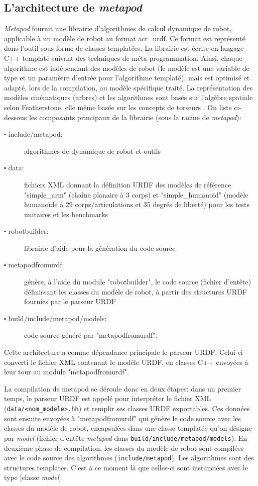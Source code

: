 \documentclass{report}
\begin{document}
\subsection{L'architecture de \emph{metapod}}

\emph{Metapod} fournit une librairie d'algorithmes de calcul dynamique de robot, applicable à un modèle de robot au format \gls{acr_urdf}. Ce format est représenté dans l'outil sous forme de classes templatées. La librairie est écrite en langage C++ templaté suivant des techniques de méta programmation. Ainsi, chaque algorithme est indépendant des modèles de robot (le modèle est une variable de type et un paramètre d'entrée pour l'algorithme templaté), mais est optimisé et adapté, lors de la compilation, au modèle spécifique traité. La représentation des modèles cinématiques (arbres) et les algorithmes sont basés sur l'algèbre spatiale selon Featherstone, elle même basée sur les concepts de torseurs \cite{bib_featherstone}. On liste ci-dessous les composants principaux de la librairie (sous la racine de \emph{metapod}):
\begin{description}
\item[$\centerdot$ include/metapod:] algorithmes de dynamique de robot et outils
\item[$\centerdot$ data:] fichiers XML donnant la définition URDF des modèles de référence "simple\_arm" (chaîne planaire à 3 corps) et "simple\_humanoid" (modèle humanoïde à 29 corps/articulations et 35 degrés de liberté) pour les tests unitaires et les benchmarks
\item[$\centerdot$ robotbuilder:] librairie d'aide pour la génération du code source 
\item[$\centerdot$ metapodfromurdf:] génère, à l'aide du module "robotbuilder", le code source (fichier d'entête) définissant les classes du modèle de robot, à partir des structures URDF fournies par le parseur URDF
\item[$\centerdot$ build/include/metapod/models:] code source généré par "metapodfromurdf".
\end{description}

Cette architecture a comme dépendance principale le parseur URDF. Celui-ci converti le fichier XML contenant le modèle URDF, en classes C++ envoyées à leur tour au module "metapodfromurdf".

La compilation de metapod se déroule donc en deux étapes: dans un premier temps, le parseur URDF est appelé pour interpréter le fichier XML (\verb;data/<nom_modele>.hh;) et remplir ses classes URDF exportables. Ces données sont ensuite envoyées à "metapodfromurdf" qui génère le code source avec les classes du modèle de robot, encapsulées dans une classe templatée qu'on désigne par \emph{model} (fichier d'entête \emph{metapod} dans \verb;build/include/metapod/models;). En deuxième phase de compilation, les classes du modèle de robot sont compilées avec le code source des algorithmes (\verb;include/metapod;). Les algorithmes sont des structures templates. C'est à ce moment là que celles-ci sont instanciées avec le type [classe \emph{model}].
\end{document}

